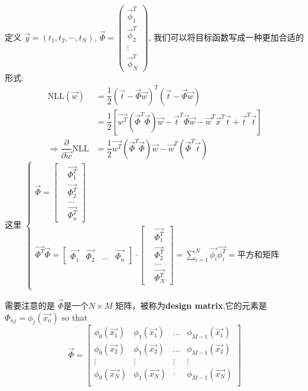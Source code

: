 \documentclass[a4paper]{article}
\begin{document}
定义 $\vec{y}=(t_1,t_2,\cdots,t_N)$, $\vec{\Phi}=\left(\begin{array}{c}\vec{\phi}_1^T \\ \vec{\phi}_2^T \\ \vdots \\ \vec{\phi}_N^T\end{array}\right)$, 我们可以将目标函数写成一种更加合适的形式:
\begin{align}
\text{NLL}(\vec{w}) &= \dfrac{1}{2}(\vec{t}-\vec{\Phi}\vec{w})^T(\vec{t}-\vec{\Phi}\vec{w})\\
&= \dfrac{1}{2} [\vec{w^T} (\vec{\Phi}^T\vec{\Phi})\vec{w} - \vec{t}^T\vec{\Phi}\vec{w}- \vec{w}^T\vec{x}^T\vec{t}  +\vec{t}^T\vec{t}]			\\
\Rightarrow
\dfrac{\partial}{\partial \vec{w}}\text{NLL} &= \dfrac{1}{2} \vec{w^T} (\vec{\Phi}^T\vec{\Phi})\vec{w} -\vec{w}^T(\vec{\Phi}^T\vec{t}) 
\end{align}
这里
$\begin{cases}
\vec{\Phi} = \begin{bmatrix}
&\vec{\Phi_1^T} \\
&\vec{\Phi_2^T} \\
& ... \\
&\vec{\Phi_n^T}
\end{bmatrix} \\	
\vec{\Phi^T}\vec{\Phi} =
\begin{bmatrix}
\vec{\Phi_1} & \vec{\Phi_2} & ...&\vec{\Phi_n}
\end{bmatrix} 
\cdot
\begin{bmatrix}
&\vec{\Phi_1^T} \\
&\vec{\Phi_2^T} \\
& ... \\
&\vec{\Phi_N^T}
\end{bmatrix}  = \sum\limits_{i=1}^{N}\vec{\phi_i}\vec{\phi_i^T} = \textbf{平方和矩阵} \\
\end{cases}$

需要注意的是 $\vec{\Phi}$是一个$N\times M$ 矩阵，被称为\textbf{design matrix},它的元素是 $\Phi_{nj}=\phi_j(\vec{x_n})$ so that
\begin{equation}
\vec{\Phi}=
\begin{bmatrix}
\phi_0(\vec{x_1}) &	\phi_1(\vec{x_1}) &...&\phi_{M-1}(\vec{x_1}) \\
\phi_0(\vec{x_2}) & \phi_1(\vec{x_2}) &...&\phi_{M-1}(\vec{x_2}) \\
\vdots &\vdots &\vdots&\vdots \\
\phi_0(\vec{x_N})& \phi_1(\vec{x_{N}})& \cdot &\phi_{M-1}(\vec{x_N})\\
\end{bmatrix}
\end{equation}
\end{document}
